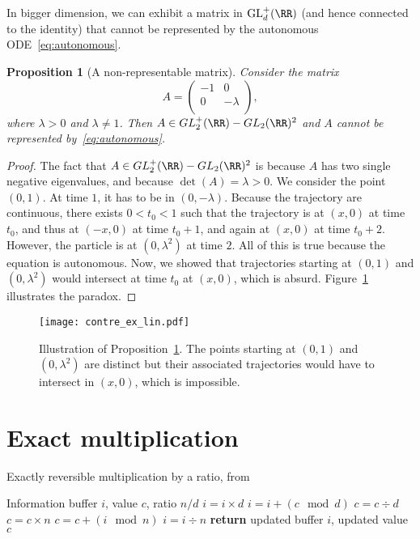 \documentclass{article}
\newtheorem{proposition}{Proposition}
\begin{document}
In bigger dimension, we can exhibit a matrix in $\mathrm{GL}_d^{+}(\RR)$ (and hence connected to the identity) that cannot be represented by the autonomous ODE~\eqref{eq:autonomous}.
\begin{proposition}[A non-representable matrix]\label{prop:contre_ex}
Consider the matrix 
$$
A=
\begin{pmatrix}
-1 & 0  \\
0 & -\lambda \\
\end{pmatrix},
$$ where $\lambda > 0$ and $\lambda \neq 1$.
Then $A \in GL_2^{+}(\RR)  - GL_2(\RR)^{2}$ and $A$ cannot be represented by~\eqref{eq:autonomous}.
\end{proposition}
\begin{proof}
The fact that $A \in GL_2^{+}(\RR)  - GL_2(\RR)^{2}$ is because $A$ has two single negative eigenvalues, and because $\det(A) = \lambda > 0$.
We consider the point $(0,1)$. At time $1$, it has to be in $(0,-\lambda)$. Because the trajectory are continuous, there exists $0 < t_0 < 1$ such that the trajectory is at $(x,0)$ at time $t_0$, and thus at $(-x,0)$ at time $t_0 + 1$, and again at $(x,0)$ at time $t_0+2$. However, the particle is at $(0,\lambda^2)$ at time $2$. All of this is true because the equation is autonomous. Now, we showed that trajectories starting at $(0,1)$ and $(0,\lambda^2)$ would intersect at time $t_0$ at $(x,0)$, which is absurd. Figure~\ref{fig:contre_ex} illustrates the paradox.
\end{proof}

\begin{figure}[ht]
\begin{center}
\centerline{\texttt{[image: contre\_ex\_lin.pdf]}}
\caption{Illustration of Proposition~\ref{prop:contre_ex}. The points starting at $(0,1)$ and $(0,\lambda^2)$ are distinct but their associated trajectories would have to intersect in $(x,0)$, which is impossible.}
\label{fig:contre_ex}
\end{center}
\end{figure}







\section{Exact multiplication}\label{app:memory_savings}

\begin{algorithm}
   \caption{Exactly reversible multiplication by a ratio, from \citet{10.5555/3045118.3045343}}
   \label{alg:reversible-mult}
\begin{algorithmic}[1]
    Information buffer $i$, value $c$, ratio $n / d$  
   \STATE $i = i \times d$ 
   \STATE $i = i + (c \! \mod d)$  \label{step:f2}
   \STATE $c = c \div d$                \label{step:f3}
   \STATE $c = c \times n$         \label{step:b1}
   \STATE $c = c +  (i \! \mod n)$         \label{step:b2}
   \STATE $i = i \div n$          \label{step:b3}
   \STATE \textbf{return} updated buffer $i$, updated value $c$
\end{algorithmic}
\end{algorithm}
\end{document}
